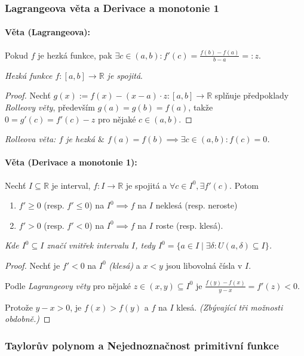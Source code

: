 \documentclass[10pt,a4paper]{article}
\newcommand{\R}{{\mathbb{R}}}
\begin{document}
\subsubsection{Lagrangeova věta a Derivace a monotonie 1}

\paragraph*{Věta (Lagrangeova):} Pokud $f$ je hezká funkce, pak $\displaystyle \exists c\in (a,b) : f'(c) = \frac{f(b) - f(a)}{b-a} =: z$.

\textit{Hezká funkce $f:[a,b] \to \R$ je spojitá}.
\begin{proof}
    Nechť $g(x):=f(x)-(x-a)\cdot z : [a,b]\to \R$ splňuje předpoklady \textit{Rolleovy věty}, především $g(a) = g(b) = f(a)$, takže $0 = g'(c) = f'(c)- z$ pro nějaké $c \in (a,b)$.
\end{proof}

\textit{Rolleova věta: $f$ je hezká $\&$ $f(a)=f(b) \implies \exists c \in (a,b):f(c) = 0$.}

\paragraph*{Věta (Derivace a monotonie 1):} Nechť $I\subseteq \R$ je interval, $f:I\to \R$ je spojitá a $\forall c \in I^0, \exists f'(c)$. Potom
\begin{enumerate}
    \item $f'\geq 0$ (resp. $f' \leq 0$) na $I^0 \implies f$ na $I$ neklesá (resp. neroste)
    \item $f' > 0$ (resp. $f' < 0$) na $I^0 \implies f$ na $I$ roste (resp. klesá).
\end{enumerate}

\textit{Kde $I^0\subseteq I$ značí vnitřek intervalu $I$, tedy $I^0 = \{a\in I \mid \exists \delta: U(a,\delta) \subseteq I\}$.}
\begin{proof}
    Nechť je $f' < 0$ na $I^0$ \textit{(klesá)} a $x < y$ jsou libovolná čísla v $I$.
    
    Podle \textit{Lagrangeovy věty} pro nějaké $z \in (x, y) \subseteq I^0$ je $\frac{f(y) - f(x)}{y-x} = f'(z) < 0$.
    
    Protože $y - x > 0$, je $f(x) > f (y)$ a $f$ na $I$ klesá. \textit{(Zbývající tři možnosti obdobně.)}
     
\end{proof}

\subsubsection{Taylorův polynom a Nejednoznačnost primitivní funkce}
\end{document}
